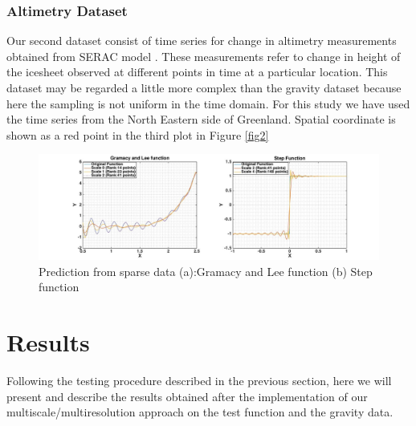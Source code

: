 \documentclass[procedia]{easychair}
\begin{document}
\subsubsection{Altimetry Dataset}

Our second dataset consist of time series for change in altimetry measurements obtained from SERAC model  \cite{schenk2012new}. These measurements refer to change in height of the icesheet observed at different points in time at a particular location. This dataset may be regarded a little more complex than the gravity dataset because here the sampling is not uniform in the time domain. For this study we have used the time series from the North Eastern side of Greenland. Spatial coordinate is shown as a red point in the third plot in Figure \ref{fig2}



\begin{figure}[]  %
	\centering
	\includegraphics[width=5in]{fig3.jpg}
	\caption[Optional caption]{Prediction from sparse data (a):Gramacy and Lee function (b) Step function}
	\label{fig3} %
\end{figure}




\section{Results}

Following the testing procedure described in the previous section, here we will present and describe the results obtained after the implementation of our multiscale/multiresolution approach on the test function and the gravity data. 
\end{document}
